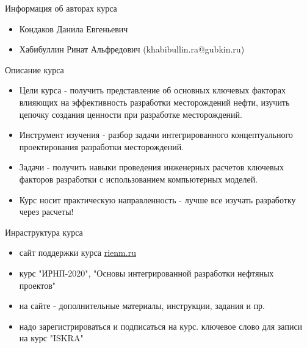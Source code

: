 \begin{frame}
\titlepage
\end{frame}

\begin{frame}{Информация об авторах курса}
\begin{itemize}
    \item Кондаков Данила Евгеньевич
    \item Хабибуллин Ринат Альфредович (khabibullin.ra@gubkin.ru)
\end{itemize}
    
\end{frame}

\begin{frame}{Описание курса}
\begin{itemize}
    \item Цели курса - получить представление об основных ключевых факторах влияющих на эффективность разработки месторождений нефти, изучить цепочку создания ценности при разработке месторождений.
    \item Инструмент изучения - разбор задачи интегрированного концептуального проектирования разработки месторождений.
    \item Задачи - получить навыки проведения инженерных расчетов ключевых факторов разработки с использованием компьютерных моделей.
    \item Курс носит практическую направленность - лучше все изучать разработку через расчеты!
\end{itemize}
\end{frame}

\begin{frame}{Инраструктура курса}
\begin{itemize}
    \item сайт поддержки курса \href{rienm.ru}{rienm.ru}
    \item курс "ИРНП-2020", "Основы интегрированной разработки нефтяных проектов"
    \item на сайте - дополнительные материалы, инструкции, задания и пр.
    \item надо зарегистрироваться и подписаться на курс. ключевое слово для записи на курс "ISKRA"
\end{itemize}
    
\end{frame}

